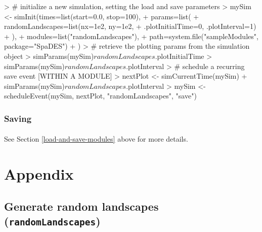 \documentclass{article}
\begin{document}
\begin{Schunk}
\begin{Sinput}
> # initialize a new simulation, setting the load and save parameters
> mySim <- simInit(times=list(start=0.0, stop=100),
+                  params=list(
+                    randomLandscapes=list(nx=1e2, ny=1e2,
+                                 .plotInitialTime=0, .plotInterval=1)
+                    ),
+                  modules=list("randomLandscapes"),
+                  path=system.file("sampleModules", package="SpaDES")
+ )
> # retrieve the plotting params from the simulation object
> simParams(mySim)$randomLandscapes$.plotInitialTime
> simParams(mySim)$randomLandscapes$.plotInterval
> # schedule a recurring save event [WITHIN A MODULE]
> nextPlot <- simCurrentTime(mySim) + simParams(mySim)$randomLandscapes$.plotInterval
> mySim <- scheduleEvent(mySim, nextPlot, "randomLandscapes", "save")
\end{Sinput}
\end{Schunk}

\subsubsection{Saving}

\paragraph{}
See Section \ref{load-and-save-modules} above for more details.

\newpage
\appendix
\renewcommand{\thesection}{}
\section{Appendix}
\renewcommand{\thesubsection}{\Alph{subsection}}

\subsection{Generate random landscapes (\texttt{randomLandscapes})}
\end{document}
